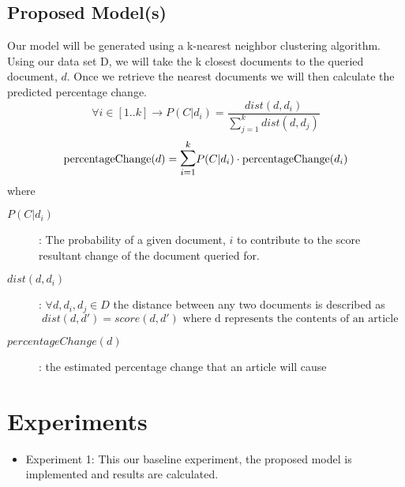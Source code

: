 \documentclass[11pt,letterpaper]{article}
\newcommand{\blue}[1]{\textcolor{RoyalBlue}{#1}}
\newcommand{\instructions}[1]{\blue{\textit{#1}}}
\begin{document}
\subsection{Proposed Model(s)}
\label{sec:proposed-models}
Our model will be generated using a k-nearest neighbor clustering algorithm.  Using our data set D, we will take the k closest documents to the queried document, \(d\). Once we retrieve the nearest documents we will then calculate the predicted percentage change.
\begin{equation}\label{doc:prob}
	 \forall i \in [1..k] \rightarrow P(C | d_i) = \frac{ dist(d,d_i) }{\sum^k_{j=1} dist(d, d_j)}
\end{equation}
\begin{equation}\label{doc:pDelta}
	\text{percentageChange}(d) = \mathlarger{\mathlarger{\sum}}^k_{i=1} P(C | d_i) \cdot \text{percentageChange}(d_i) 
\end{equation}
where
\begin{description}
	\item[\(P(C | d_i)\)] : The probability of a given document, \( i \) to contribute to the score resultant change of the document queried for.
	\item[\textbf{\(dist(d,d_i)\)}] : \( \forall d, d_i, d_j \in D \) the distance between any two documents is described as
	\begin{equation}\label{doc:distAlias}
		dist(d, d') = score(d, d') \text{ where d represents the contents of an article } 
	\end{equation}
	\item[\(percentageChange(d)\)] : the estimated percentage change that an article will cause
\end{description}

\section{Experiments}
\begin{itemize}
  \item Experiment 1: This our baseline experiment, the proposed model is
  implemented and results are calculated.
\end{itemize}
\end{document}
